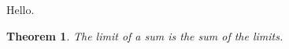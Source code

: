 \documentclass{article}
\newtheorem{thrm}{Theorem}
\begin{document}
Hello.

\begin{thrm}
The limit of a sum is the sum of the limits.
\end{thrm}
\end{document}

